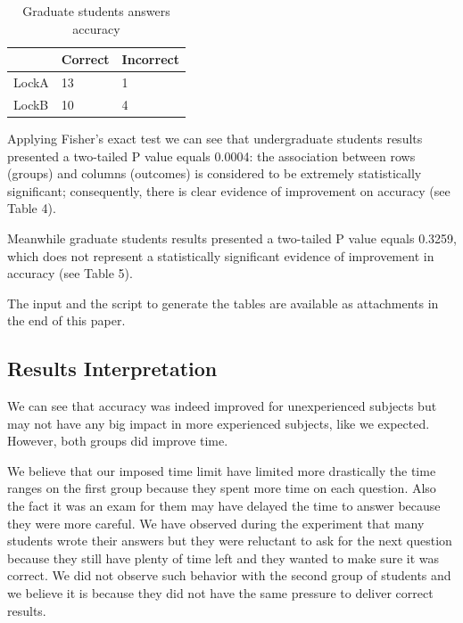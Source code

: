 \begin{table}
\begin{center}
\caption{Graduate students answers accuracy}
\begin{tabular}{|l|l|l|}
\hline
 & Correct & Incorrect\\
\hline
LockA & 13 & 1\\
LockB & 10 & 4\\
\hline
\end{tabular}
\end{center}
\end{table}

Applying Fisher's exact test we can see that undergraduate students results presented a two-tailed P value equals 0.0004: the association between rows (groups) and columns (outcomes) is considered to be extremely statistically significant; consequently, there is clear evidence of improvement on accuracy (see Table 4).

Meanwhile graduate students results presented a two-tailed P value equals 0.3259, which does not represent a statistically significant evidence of improvement in accuracy (see Table 5).

The input and the script to generate the tables are available as attachments in the end of this paper.


\subsection{Results Interpretation}

We can see that accuracy was indeed improved for unexperienced subjects but may not have any big impact in more experienced subjects, like we expected. However, both groups did improve time.

We believe that our imposed time limit have limited more drastically the time ranges on the first group because they spent more time on each question. Also the fact it was an exam for them may have delayed the time to answer because they were more careful. We have observed during the experiment that many students wrote their answers but they were reluctant to ask for the next question because they still have plenty of time left and they wanted to make sure it was correct. We did not observe such behavior with the second group of students and we believe it is because they did not have the same pressure to deliver correct results.


